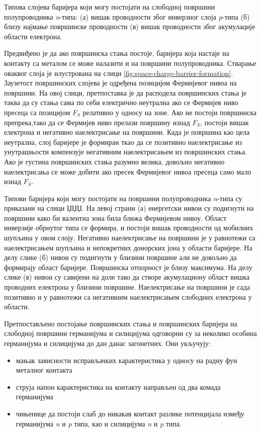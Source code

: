 \documentclass{article}
\begin{document}
Типова слојева баријера који могу постојати на слободној површини полупроводника \textit{n}-типа: (а) вишак проводности због инверзног слоја \textit{p}-типа (б) близу најмање површинске проводности (в) вишак проводности због акумулације области електрона.

Предвиђено је да ако површинска стања постоје, баријера која настаје на контакту са металом се може налазити и на површини полупроводника. Стварање оваквог слоја је илустрована на слици 	\ref{fig:space-charge-barrier-formation}. Заузетост површинских слојева је одређена позицијом Фермијевог нивоа на површини. На овој слици, претпоставка је да расподела површинских стања је таква да су стања сама по себи електрично неутрална ако се Фермијев ниво пресеца са позицијом $F_S$ релативно у односу на зоне. Ако не постоји површинска препрека,тако да се Фермијев ниво прелази површину изнад $F_S$, постоји вишак електрона и негативно наелектрисање на површини. Када је површина као цела неутрална, слој баријере је формиран ткао да се позитивно наелектрисање из унутрашњости компензује негативним наелектрисањем из површинских стања. Ако је густина површинских стања разумно велика, довољно негативно наелектрисања се може добити ако пресек Фермијевог нивоа пресеца само мало изнад $F_S$. 

Типови баријера који могу постојати на површини полупроводника \textit{n}-типа су приказани на слици ЏЏЏ. На левој страни (а) енергетски нивои су подигнути на површини како би валентна зона била ближа Фермијевом нивоу. Област инверзије обрнутог типа се формира, и постоји вишак проводности од мобилних шупљина у овом слоју. Негативно наелектрисање на површини је у равнотежи са наелектрисањем шупљина и непокретних донорских јона у области баријере. На делу слике (б) нивои су подигнути у близини површине али не довољно да формирају област баријере. Површинска отпорност је близу максимума. На делу слике (в) нивои су савијени на доле тако да створе акумулациону област вишка проводних електрона у близини површине. Наелектрисање на површини је сада позитивно и у равнотежи са негативним наелектрисањем слободних електрона у области.  

Претпостављено постојање површинских стања и површинских баријера на слободној површини германијума и силицијума одговорни су за неколико особина германијума и силицијума до дан данас загонетних. Они укључују:

\begin{itemize}
	\item мањак зависности исправљачких карактеристика у односу на радну фун металног контакта
	\item струја напон карактеристика на контакту направљен од два комада германијума
	\item чињенице да постоји слаб до никакав контакт разлике потенцијала између германијума \textit{n} и \textit{p} типа, као и силицијума \textit{n} и \textit{p} типа.
\end{itemize}
\end{document}
